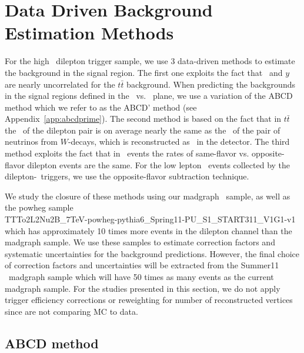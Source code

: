 \section{Data Driven Background Estimation Methods}
\label{sec:datadriven}

For the high \pt\ dilepton trigger sample, we use 3 data-driven methods to 
estimate the background in the signal region. The first one exploits the fact that 
\Ht\ and $y$ are nearly uncorrelated for the $t\bar{t}$ background.
When predicting the backgrounds in the signal regions defined in the \met\ vs. \Ht\ plane,
we use a variation of the ABCD method which we refer to as the ABCD' method
(see Appendix~\ref{app:abcdprime}).
The second method
is based on the fact that in $t\bar{t}$ the \pt\ of the dilepton pair is on average 
nearly the same as the \pt\ of the pair of neutrinos
from $W$-decays, which is reconstructed as \met\ in the
detector. The third method exploits the fact that in \ttbar\ events
the rates of same-flavor vs. opposite-flavor dilepton events are
the same. For the low lepton \pt\ events collected by the dilepton-\Ht\ triggers,
we use the opposite-flavor subtraction technique.

We study the closure of these methods using our madgraph \ttbar\ sample, as well as 
the powheg sample \\
TTTo2L2Nu2B\_7TeV-powheg-pythia6\_Spring11-PU\_S1\_START311\_V1G1-v1
which has approximately 10 times more events in the dilepton channel than the madgraph sample.
We use these samples to estimate correction factors and systematic uncertainties for the background predictions. 
However, the final choice of correction factors and uncertainties will be extracted from the Summer11 \ttbar\ madgraph
sample which will have 50 times as many events as the current madgraph sample. 
For the studies presented in this section, we do not apply trigger efficiency corrections or reweighting for
number of reconstructed vertices since are not comparing MC to data. 

\subsection{ABCD method}
\label{sec:abcd}


